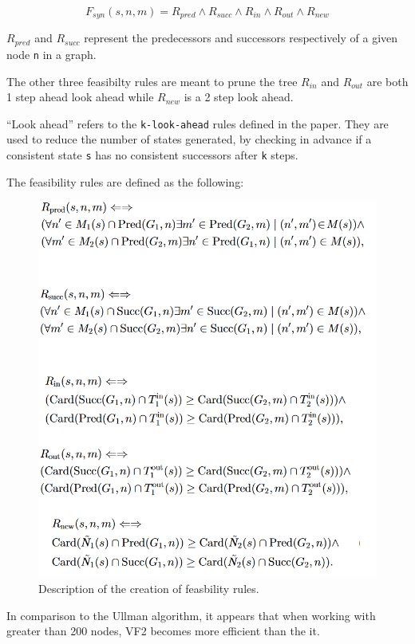 \documentclass{article}
\begin{document}
  \[ F_{syn}(s,n,m) = R_{pred} \land R_{succ} \land R_{in} \land R_{out} \land R_{new} \]

  $R_{pred}$ and $R_{succ}$ represent the predecessors and successors respectively of a given node \texttt{n}  in a graph.

  The other three feasibilty rules are meant to prune the tree
  $R_{in}$ and $R_{out}$ are both 1 step ahead look ahead while $R_{new}$ is a 2 step look ahead.

  ``Look ahead'' refers to the \texttt{k-look-ahead} rules defined in the paper. They are used to reduce the number of states generated, by checking in advance if a consistent state \texttt{s} has no consistent successors after \texttt{k} steps.

  The feasibility rules are defined as the following:

  \begin{figure}[H]
    \centering
    \includegraphics{images/vf2_algo.png}
    \caption{Description of the creation of feasbility rules.}
    \label{fig:vf2feas}
  \end{figure}

  In comparison to the Ullman algorithm, it appears that when working with greater than 200 nodes, VF2 becomes more efficient than the it.
\end{document}
